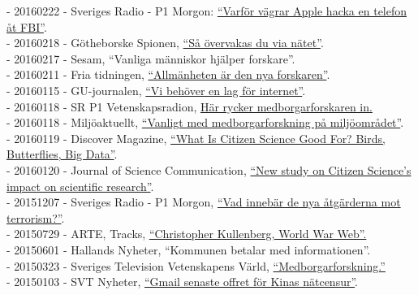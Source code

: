\documentclass[a4paper,11pt,oneside]{article}
\begin{document}
    - 20160222 - Sveriges Radio - P1 Morgon: \href{http://t.sr.se/1KBHSak}{``Varför vägrar Apple hacka en telefon åt FBI''}. \\
    - 20160218 - Götheborske Spionen, \href{http://www.spionen.se/140-redaktionellt/reportage/feature/1593-sa-oevervakas-du-via-naetet}{``Så övervakas du via nätet''}. \\
    - 20160217 - Sesam, ``Vanliga människor hjälper forskare''.\\
    - 20160211 - Fria tidningen, \href{http://www.fria.nu/artikel/121724}{``Allmänheten är den nya forskaren''}. \\
    - 20160115 - GU-journalen, \href{https://issuu.com/universityofgothenburg/docs/guj1-2016/32}{``Vi behöver en lag för internet''}. \\
    - 20160118 - SR P1 Vetenskapsradion, \href{http://t.sr.se/239vggG}{Här rycker medborgarforskaren in.}\\
    - 20160118 - Miljöaktuellt, \href{http://miljoaktuellt.se/vanligare-att-forskare-tar-hjalp-av-allmanheten/}{``Vanligt med medborgarforskning på miljöområdet''}. \\
    - 20160119 - Discover Magazine, \href{http://blogs.discovermagazine.com/inkfish/2016/01/19/what-is-citizen-science-good-for-birds-butterflies-big-data/#.Vp9DvPGFB24}{``What Is Citizen Science Good For? Birds, Butterflies, Big Data''}. \\
    - 20160120 - Journal of Science Communication, \href{http://jcom.sissa.it/node/3076}{``New study on Citizen Science’s impact on scientific research''}. \\
    - 20151207 - Sveriges Radio - P1 Morgon, \href{http://t.sr.se/1XMYemi}{``Vad innebär de nya åtgärderna mot terrorism?''}. \\
    - 20150729 - ARTE, Tracks, \href{http://tracks.arte.tv/fr/christopher-kullenberg-world-war-web}{``Christopher Kullenberg, World War Web''.} \\
    - 20150601 - Hallands Nyheter, ``Kommunen betalar med informationen''.\\
    - 20150323 - Sveriges Television Vetenskapens Värld, \href{https://youtu.be/vG8sZQnU7mU?t=18m1s}{``Medborgarforskning.''} \\
    - 20150103 - SVT Nyheter, \href{http://www.svt.se/nyheter/utrikes/gmail-senaste-malet-for-kinas-natcensur?cmpid=del:pd:ny:20160803:gmail-senaste-malet-for-kinas-natcensur:nyh}{``Gmail senaste offret för Kinas nätcensur''}. \\
\end{document}
